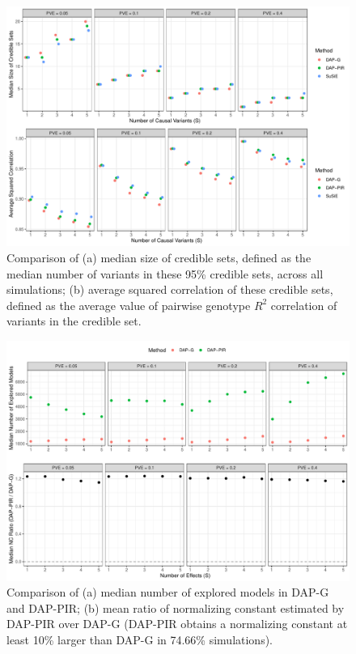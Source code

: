 \documentclass[pdflatex,sn-mathphys-num]{sn-jnl}%
\theoremstyle{thmstyleone}%
\theoremstyle{thmstyletwo}%
\theoremstyle{thmstylethree}%
\begin{document}
\begin{figure}[H]
    \centering
    \includegraphics[width=1\textwidth]{files/plot_size.pdf}
    \caption{Comparison of (a) median size of credible sets, defined as the median number of variants in these 95\% credible sets, across all simulations; (b) average squared correlation of these credible sets, defined as the average value of pairwise genotype $R^2$ correlation of variants in the credible set.}
    \label{fig:size}
\end{figure}



\begin{figure}[H]
    \centering
    \includegraphics[width=1\textwidth]{files/plot_ratio.pdf}
    \caption{Comparison of (a) median number of explored models in DAP-G and DAP-PIR; (b) mean ratio of normalizing constant estimated by DAP-PIR over DAP-G (DAP-PIR obtains a normalizing constant at least 10\% larger than DAP-G in 74.66\% simulations).}
    \label{fig:ratio}
\end{figure}
\end{document}
